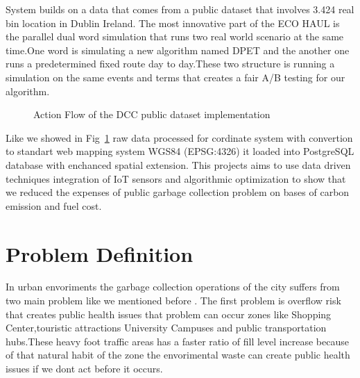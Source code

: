 \documentclass[12pt,a4paper]{report}
\begin{document}
\indent System builds on  a data that comes from a public dataset that involves 3.424 real bin location in Dublin Ireland.
The most innovative part of the ECO HAUL is the parallel dual word simulation that runs two real world scenario at the same time.One word is simulating a new algorithm named DPET and the another one runs a predetermined fixed route day to day.These two structure is running a simulation on the same events and terms that creates a fair A/B testing for our algorithm.

\begin{figure}[H]
\centering
{}
\caption{Action Flow of the DCC public dataset implementation}
\label{fig:data_intake}
\end{figure}

\indent Like we showed in Fig~\ref{fig:data_intake} raw data processed for cordinate system with convertion to standart web mapping system WGS84 (EPSG:4326) it loaded into PostgreSQL database with enchanced spatial extension. This projects aims to use data driven techniques integration of IoT sensors and algorithmic optimization to show that we reduced the expenses of public garbage collection problem on bases of carbon emission and fuel cost.
\section{Problem Definition}

\indent In urban envoriments the garbage collection operations of the city suffers from two main problem like we mentioned before . The first problem is overflow risk that creates public health issues that problem can occur zones like Shopping Center,touristic attractions University Campuses and public transportation hubs.These heavy foot traffic areas has a faster ratio of fill level increase because of that natural habit of the zone the envorimental waste can create public health issues if we dont act before it occurs.
\end{document}
